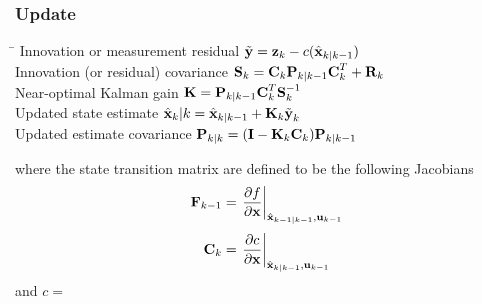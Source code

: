 \subsubsection*{Update}
\begin{tabbing}
\hspace{8cm}\=\kill
Innovation or measurement residual\> $\tilde{\textbf{y}}= \textbf{z}_k-c(\hat{\textbf{x}}_{k|k-1})$\\
Innovation (or residual) covariance\> $\textbf{S}_k=\textbf{C}_k\textbf{P}_{k|k-1}\textbf{C}^T_k+\textbf{R}_k$\\
Near-optimal Kalman gain\> $\textbf{K}=\textbf{P}_{k|k-1}\textbf{C}^T_k\textbf{S}^{-1}_k$\\
Updated state estimate\> $\hat{\textbf{x}}_k|k=\hat{\textbf{x}}_{k|k-1}+\textbf{K}_k\tilde{\textbf{y}}_k$\\
Updated estimate covariance\> $\textbf{P}_{k|k}=(\textbf{I}-\textbf{K}_k\textbf{C}_k)\textbf{P}_{k|k-1}$
\end{tabbing}
where the state transition matrix are defined to be the following Jacobians
\begin{equation*}
	\textbf{F}_{k-1}=\left. \frac{\partial f}{\partial \textbf{x}}\right|_{{\hat{\textbf{x}}_{k-1|k-1},			\textbf{u}_{k-1}}}
\end{equation*}
\begin{equation*}
	\textbf{C}_{k}=\left. \frac{\partial c}{\partial \textbf{x}}\right|_{{\hat{\textbf{x}}_{k|k-1},			\textbf{u}_{k-1}}}
\end{equation*}
and $c = $